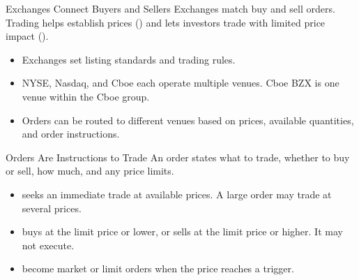 \documentclass[aspectratio=169,11pt]{beamer}
\begin{document}
\begin{frame}{\large Exchanges Connect Buyers and Sellers}
  Exchanges match buy and sell orders. Trading helps establish prices
  () and lets investors trade with limited price impact
  ().

  \vspace{0.7em}
  \begin{itemize}\setlength{\itemsep}{0.7em}
    \item Exchanges set listing standards and trading rules.
    \item NYSE, Nasdaq, and Cboe each operate multiple venues.
      Cboe BZX is one venue within the Cboe group.
    \item Orders can be routed to different venues based on prices,
      available quantities, and order instructions.
  \end{itemize}

\end{frame}

\begin{frame}{Orders Are Instructions to Trade}
  An order states what to trade, whether to buy or sell, how much,
  and any price limits.

  \vspace{0.8em}
  \begin{itemize}\setlength{\itemsep}{0.8em}
    \item \textbf{} seeks an immediate trade at available
      prices. A large order may trade at several prices.
    \item \textbf{} buys at the limit price or lower,
      or sells at the limit price or higher. It may not execute.
    \item \textbf{} become market or limit
      orders when the price reaches a trigger.
  \end{itemize}

\end{frame}
\end{document}
